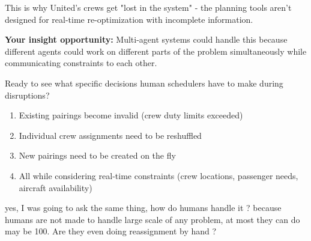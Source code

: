 \begin{botresponse}
This is why United's crews get "lost in the system" - the planning tools aren't designed for real-time re-optimization with incomplete information.

\textbf{Your insight opportunity:} Multi-agent systems could handle this because different agents could work on different parts of the problem simultaneously while communicating constraints to each other.

Ready to see what specific decisions human schedulers have to make during disruptions?

\begin{enumerate}
\item Existing pairings become invalid (crew duty limits exceeded)
\item Individual crew assignments need to be reshuffled
\item New pairings need to be created on the fly
\item All while considering real-time constraints (crew locations, passenger needs, aircraft availability)
\end{enumerate}
\end{botresponse}

\begin{userprompt}
yes, I was going to ask the same thing, how do humans handle it ? because humans are not made to handle large scale of any problem, at most they can do may be 100. Are they even doing reassignment by hand ?
\end{userprompt}

